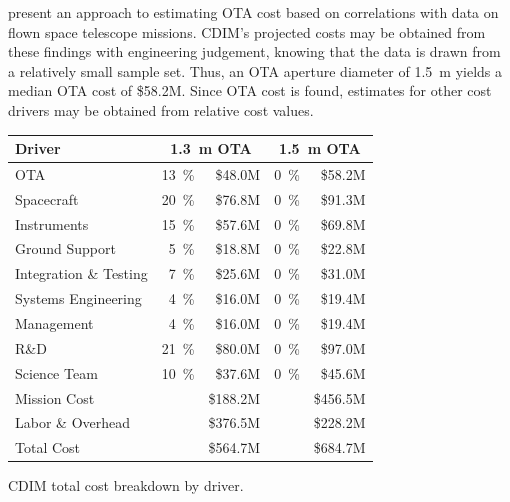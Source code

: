 \documentclass{ws-jai}
\begin{document}
\citeauthor{stahl2013} present an approach to estimating OTA cost based on correlations with data on flown space telescope missions.
CDIM's projected costs may be obtained from these findings with engineering judgement, knowing that the data is drawn from a relatively small sample set.
Thus, an OTA aperture diameter of \SI{1.5}{\meter} yields a median OTA cost of \$58.2M.
Since OTA cost is found, estimates for other cost drivers may be obtained from relative cost values.
\begin{wstable}[htp]
  \centering
  \begin{tabular}{@{}lrrrr@{}}\toprule
    Driver                 & \multicolumn{2}{c}{\SI{1.3}{\meter} OTA} & \multicolumn{2}{c}{\SI{1.5}{\meter} OTA} \\ \midrule
    OTA                    & \SI{13}{\percent}     & \$48.0M      & \SI{0}{\percent}      & \$58.2M      \\
    Spacecraft             & \SI{20}{\percent}     & \$76.8M      & \SI{0}{\percent}      & \$91.3M      \\
    Instruments            & \SI{15}{\percent}     & \$57.6M      & \SI{0}{\percent}      & \$69.8M      \\
    Ground Support         & \SI{5}{\percent}      & \$18.8M      & \SI{0}{\percent}      & \$22.8M      \\
    Integration \& Testing & \SI{7}{\percent}      & \$25.6M      & \SI{0}{\percent}      & \$31.0M      \\
    Systems Engineering    & \SI{4}{\percent}      & \$16.0M      & \SI{0}{\percent}      & \$19.4M      \\
    Management             & \SI{4}{\percent}      & \$16.0M      & \SI{0}{\percent}      & \$19.4M      \\
    R\&D                   & \SI{21}{\percent}     & \$80.0M      & \SI{0}{\percent}      & \$97.0M      \\
    Science Team           & \SI{10}{\percent}     & \$37.6M      & \SI{0}{\percent}      & \$45.6M      \\ \midrule
    Mission Cost           &                       & \$188.2M     &                       & \$456.5M     \\
    Labor \& Overhead      &                       & \$376.5M     &                       & \$228.2M     \\
    Total Cost             &                       & \$564.7M     &                       & \$684.7M     \\ \bottomrule
  \end{tabular}
  \caption{CDIM total cost breakdown by driver. 
\label{tab:total-cost}
}
\end{wstable}
\end{document}

